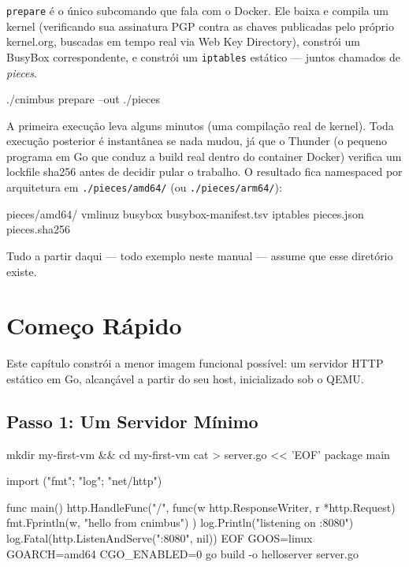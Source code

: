 \documentclass[11pt,letterpaper]{report}
\begin{document}
\texttt{prepare} é o único subcomando que fala com o Docker. Ele baixa
e compila um kernel (verificando sua assinatura PGP contra as chaves
publicadas pelo próprio kernel.org, buscadas em tempo real via Web Key
Directory), constrói um BusyBox correspondente, e constrói um
\texttt{iptables} estático --- juntos chamados de \textit{pieces}.

\begin{shell}
./cnimbus prepare --out ./pieces
\end{shell}

A primeira execução leva alguns minutos (uma compilação real de
kernel). Toda execução posterior é instantânea se nada mudou, já que o
Thunder (o pequeno programa em Go que conduz a build real dentro do
container Docker) verifica um lockfile sha256 antes de decidir pular o
trabalho. O resultado fica namespaced por arquitetura em
\texttt{./pieces/amd64/} (ou \texttt{./pieces/arm64/}):

\begin{shell}
pieces/amd64/
  vmlinuz
  busybox
  busybox-manifest.tsv
  iptables
  pieces.json
  pieces.sha256
\end{shell}

Tudo a partir daqui --- todo exemplo neste manual --- assume que esse
diretório existe.

\chapter{Começo Rápido}
\label{ch:quickstart}

Este capítulo constrói a menor imagem funcional possível: um servidor
HTTP estático em Go, alcançável a partir do seu host, inicializado sob
o QEMU.

\section{Passo 1: Um Servidor Mínimo}

\begin{shell}
mkdir my-first-vm && cd my-first-vm
cat > server.go << 'EOF'
package main

import ("fmt"; "log"; "net/http")

func main() {
    http.HandleFunc("/", func(w http.ResponseWriter, r *http.Request) {
        fmt.Fprintln(w, "hello from cnimbus")
    })
    log.Println("listening on :8080")
    log.Fatal(http.ListenAndServe(":8080", nil))
}
EOF
GOOS=linux GOARCH=amd64 CGO_ENABLED=0 go build -o helloserver server.go
\end{shell}
\end{document}
